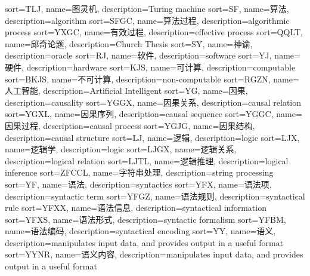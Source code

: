 {
  sort=TLJ,
  name=图灵机,
  description={Turing machine}
}
{
  sort=SF,
  name=算法,
  description={algorithm}
}
{
  sort=SFGC,
  name=算法过程,
  description={algorithmic process}
}
{
  sort=YXGC,
  name=有效过程,
  description={effective process}
}
{
  sort=QQLT,
  name=邱奇论题,
  description={Church Thesis}
}
{
  sort=SY,
  name=神谕,
  description={oracle}
}
{
  sort=RJ,
  name=软件,
  description={software}
}
{
  sort=YJ,
  name=硬件,
  description={hardware}
}
{
  sort=KJS,
  name=可计算,
  description={computable}
}
{
  sort=BKJS,
  name=不可计算,
  description={non-computable}
}
{
  sort=RGZN,
  name=人工智能,
  description={Artificial Intelligent}
}
{
  sort=YG,
  name=因果,
  description={causality}
}
{
  sort=YGGX,
  name=因果关系,
  description={causal relation}
}
{
  sort=YGXL,
  name=因果序列,
  description={causal sequence}
}
{
  sort=YGGC,
  name=因果过程,
  description={causal process}
}
{
  sort=YGJG,
  name=因果结构,
  description={causal structure}
}
{
  sort=LJ,
  name=逻辑,
  description={logic}
}
{
  sort=LJX,
  name=逻辑学,
  description={logic}
}
{
  sort=LJGX,
  name=逻辑关系,
  description={logical relation}
}
{
  sort=LJTL,
  name=逻辑推理,
  description={logical inference}
}
{
  sort=ZFCCL,
  name=字符串处理,
  description={string processing}
}
{
  sort=YF,
  name=语法,
  description={syntactics}
}
{
  sort=YFX,
  name=语法项,
  description={syntactic term}
}
{
  sort=YFGZ,
  name=语法规则,
  description={syntactical rule}
}
{
  sort=YFXX,
  name=语法信息,
  description={syntactical information}
}
{
  sort=YFXS,
  name=语法形式,
  description={syntactic formalism}
}
{
  sort=YFBM,
  name=语法编码,
  description={syntactical encoding}
}
{
  sort=YY,
  name=语义,
  description={manipulates input data, and provides output in a useful format}
}
{
  sort=YYNR,
  name=语义内容,
  description={manipulates input data, and provides output in a useful format}
}
